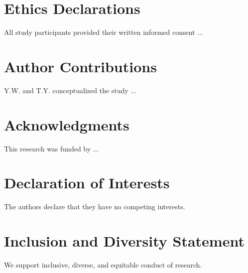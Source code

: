 \documentclass[preprint,review,12pt]{elsarticle}%
\begin{document}
\begin{frontmatter}
% 

% 




\section*{Ethics Declarations}
All study participants provided their written informed consent ...
\label{ethics declarations}

\section*{Author Contributions}
Y.W. and T.Y. conceptualized the study ...
\label{author contributions}

\section*{Acknowledgments}
This research was funded by ...
\label{acknowledgments}

\section*{Declaration of Interests}
The authors declare that they have no competing interests.
\label{declaration of interests}

\section*{Inclusion and Diversity Statement}
We support inclusive, diverse, and equitable conduct of research.
\label{inclusion and diversity statement}


\end{frontmatter}
\end{document}
